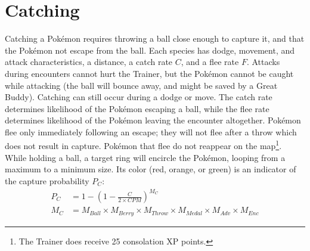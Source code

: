 \section{Catching}
\label{sec:catch}
Catching a Pokémon requires throwing a ball close enough to capture it,
 and that the Pokémon not escape from the ball.
Each species has dodge, movement, and attack characteristics, a distance, a catch rate $C$, and a flee rate $F$.
Attacks during encounters cannot hurt the Trainer, but the Pokémon cannot be caught
  while attacking (the ball will bounce away, and might be saved by a Great Buddy).
Catching can still occur during a dodge or move.
The catch rate determines likelihood of the Pokémon escaping a ball,
  while the flee rate determines likelihood of the Pokémon leaving the encounter altogether.
Pokémon flee only immediately following an escape; they will not flee after a throw which
  does not result in capture.
Pokémon that flee do not reappear on the map\footnote{The Trainer does receive 25 consolation XP points.}.
While holding a ball, a target ring will encircle the Pokémon, looping from a maximum to a minimum size.
Its color (red, orange, or green) is an indicator of the capture probability $P_C$:
\begin{align*}
  P_C &= 1-\left(1 - \frac{C}{2\times{}CPM}\right)^{M_C}\\
  M_C &= M_{Ball} \times M_{Berry} \times M_{Throw} \times M_{Medal} \times M_{Adv} \times M_{Enc}
\end{align*}
